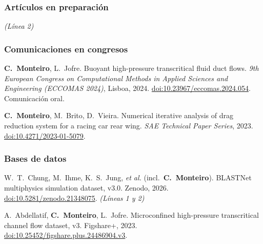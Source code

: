 \documentclass[11pt]{article}
\begin{document}
\subsubsection*{Art\'iculos en preparaci\'on}
\begin{enumerate}[label={[R\arabic*]}]
  \item {} \emph{(L\'inea 2)}
\end{enumerate}

\subsubsection*{Comunicaciones en congresos}
\begin{enumerate}[label={[C\arabic*]}]
  \item \textbf{C.\ Monteiro}, L.\ Jofre. Buoyant high-pressure transcritical fluid duct
  flows. \emph{9th European Congress on Computational Methods in Applied Sciences and
  Engineering (ECCOMAS 2024)}, Lisboa, 2024.
  \href{https://doi.org/10.23967/eccomas.2024.054}{doi:10.23967/eccomas.2024.054}. Comunicaci\'on oral.
  \item \textbf{C.\ Monteiro}, M.\ Brito, D.\ Vieira. Numerical iterative analysis of drag
  reduction system for a racing car rear wing. \emph{SAE Technical Paper Series}, 2023.
  \href{https://doi.org/10.4271/2023-01-5079}{doi:10.4271/2023-01-5079}.
\end{enumerate}

\subsubsection*{Bases de datos}
\begin{enumerate}[label={[D\arabic*]}]
  \item W.\ T.\ Chung, M.\ Ihme, K.\ S.\ Jung, \emph{et al.} (incl.\ \textbf{C.\ Monteiro}).
  BLASTNet multiphysics simulation dataset, v3.0. Zenodo, 2026.
  \href{https://doi.org/10.5281/zenodo.21348075}{doi:10.5281/zenodo.21348075}. \emph{(L\'ineas 1 y 2)}
  \item A.\ Abdellatif, \textbf{C.\ Monteiro}, L.\ Jofre. Microconfined high-pressure
  transcritical channel flow dataset, v3. Figshare+, 2023.
  \href{https://doi.org/10.25452/figshare.plus.24486904.v3}{doi:10.25452/figshare.plus.24486904.v3}.
\end{enumerate}
\end{document}
